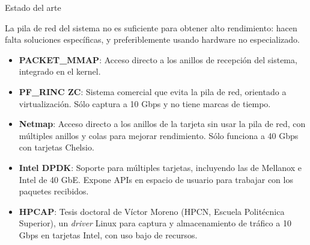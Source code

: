 \documentclass[10pt,notes,compress,usetitleprogressbar,aspectratio=1610]{beamer}
\begin{document}
\begin{frame}{Estado del arte}


La pila de red del sistema no es suficiente para obtener alto rendimiento: hacen falta soluciones específicas, y preferiblemente usando hardware no especializado.

\begin{itemize}
\item \textbf{PACKET\_MMAP}: Acceso directo a los anillos de recepción del sistema, integrado en el kernel. 
\item \textbf{PF\_RINC ZC}: Sistema comercial que evita la pila de red, orientado a virtualización. Sólo captura a 10 Gbps y no tiene marcas de tiempo. 
\item \textbf{Netmap}: Acceso directo a los anillos de la tarjeta sin usar la pila de red, con múltiples anillos y colas para mejorar rendimiento. Sólo funciona a 40 Gbps con tarjetas Chelsio.
\item \textbf{Intel DPDK}: Soporte para múltiples tarjetas, incluyendo las de Mellanox e Intel de 40 GbE. Expone APIs en espacio de usuario para trabajar con los paquetes recibidos.
\item \textbf{HPCAP}: Tesis doctoral de Víctor Moreno (HPCN, Escuela Politécnica Superior), un \textit{driver} Linux para captura y almacenamiento de tráfico a 10 Gbps en tarjetas Intel, con uso bajo de recursos. 
\end{itemize}
\end{frame}
\end{document}
